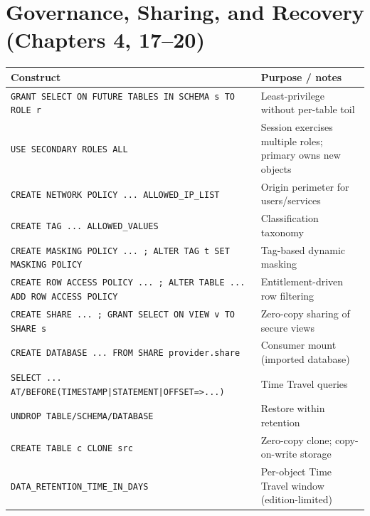 \section{Governance, Sharing, and Recovery (Chapters 4, 17--20)}
\begin{center}
\footnotesize
\begin{tabular}{@{}p{5.6cm}p{8.6cm}@{}}
\toprule
\textbf{Construct} & \textbf{Purpose / notes} \\
\midrule
\texttt{GRANT SELECT ON FUTURE TABLES IN SCHEMA s TO ROLE r} & Least-privilege without per-table toil \\
\texttt{USE SECONDARY ROLES ALL} & Session exercises multiple roles; primary owns new objects \\
\texttt{CREATE NETWORK POLICY ... ALLOWED\_IP\_LIST} & Origin perimeter for users/services \\
\texttt{CREATE TAG ... ALLOWED\_VALUES} & Classification taxonomy \\
\texttt{CREATE MASKING POLICY ... ; ALTER TAG t SET MASKING POLICY} & Tag-based dynamic masking \\
\texttt{CREATE ROW ACCESS POLICY ... ; ALTER TABLE ... ADD ROW ACCESS POLICY} & Entitlement-driven row filtering \\
\texttt{CREATE SHARE ... ; GRANT SELECT ON VIEW v TO SHARE s} & Zero-copy sharing of secure views \\
\texttt{CREATE DATABASE ... FROM SHARE provider.share} & Consumer mount (imported database) \\
\texttt{SELECT ... AT/BEFORE(TIMESTAMP|STATEMENT|OFFSET=>...)} & Time Travel queries \\
\texttt{UNDROP TABLE/SCHEMA/DATABASE} & Restore within retention \\
\texttt{CREATE TABLE c CLONE src} & Zero-copy clone; copy-on-write storage \\
\texttt{DATA\_RETENTION\_TIME\_IN\_DAYS} & Per-object Time Travel window (edition-limited) \\
\bottomrule
\end{tabular}
\end{center}

